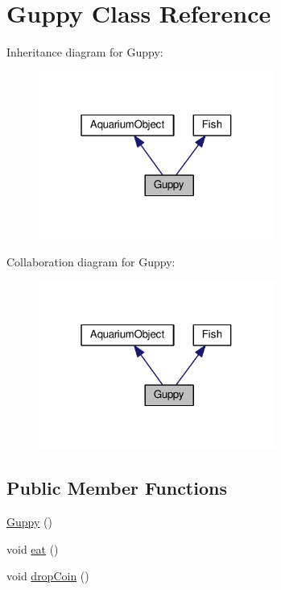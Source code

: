 \hypertarget{class_guppy}{}\section{Guppy Class Reference}
\label{class_guppy}


Inheritance diagram for Guppy\+:
\nopagebreak
\begin{figure}[H]
\begin{center}
\leavevmode
\includegraphics[width=220pt]{class_guppy__inherit__graph}
\end{center}
\end{figure}


Collaboration diagram for Guppy\+:
\nopagebreak
\begin{figure}[H]
\begin{center}
\leavevmode
\includegraphics[width=220pt]{class_guppy__coll__graph}
\end{center}
\end{figure}
\subsection*{Public Member Functions}
\begin{DoxyCompactItemize}
\item 
\mbox{\hyperlink{class_guppy_a6336822c9cc2106fad2aaa2e54d159ac}{Guppy}} ()
\item 
void \mbox{\hyperlink{class_guppy_a8cae34f3e9f4011e41da1d098363f1fc}{eat}} ()
\item 
void \mbox{\hyperlink{class_guppy_ace5750be512718d97f184f6ede72d25f}{drop\+Coin}} ()
\end{DoxyCompactItemize}
